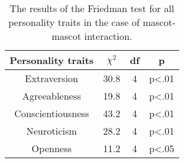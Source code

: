 \begin{table}[hbt!]
    \renewcommand{\arraystretch}{1}
    \begin{center}
        \begin{tabular}{|c|c|c|c|}
            \hline
            \textbf{Personality traits} & \textbf{$\chi^2$} & \textbf{df} & \textbf{p} \\
            \hline
            Extraversion &30.8 &4 &p<.01 \\
            \hline
            Agreeableness &19.8 &4 &p<.01 \\
            \hline
            Conscientiousness & 43.2 &4 &p<.01 \\
            \hline
            Neuroticism &28.2 &4 &p<.01\\
            \hline
            Openness &11.2 &4 &p<.05 \\
            \hline
        \end{tabular}
        \caption{The results of the Friedman test for all personality traits in the case of mascot-mascot interaction.}
        \label{table:friedmanMM1}
    \end{center}
\end{table}

